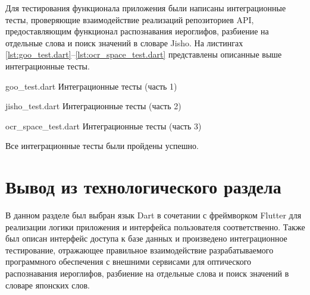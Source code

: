 Для тестирования функционала приложения были написаны интеграционные тесты, проверяющие взаимодействие реализаций репозиториев API, предоставляющим функционал распознавания иероглифов, разбиение на отдельные слова и поиск значений в словаре Jisho. На листингах \ref{lst:goo_test.dart}--\ref{lst:ocr_space_test.dart} представлены описанные выше интеграционные тесты.

    {goo_test.dart}
    {Интеграционные тесты (часть 1)}

\clearpage

    {jisho_test.dart}
    {Интеграционные тесты (часть 2)}

    {ocr_space_test.dart}
    {Интеграционные тесты (часть 3)}

Все интеграционные тесты были пройдены успешно.

\section*{Вывод из технологического раздела}

В данном разделе был выбран язык Dart в сочетании с фреймворком Flutter для реализации логики приложения и интерфейса пользователя соответственно. Также был описан интерфейс доступа к базе данных и произведено интеграционное тестирование, отражающее правильное взаимодействие разрабатываемого программного обеспечения с внешними сервисами для оптического распознавания иероглифов, разбиение на отдельные слова и поиск значений в словаре японских слов.
